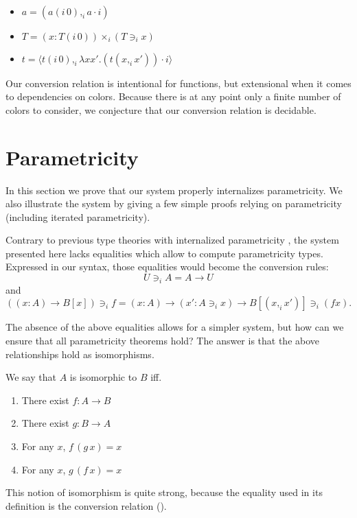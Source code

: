 \documentclass[english]{PaperTools/latex/lipics}
\newcommand\CP[3]{(#2,_{#1} #3)}
\newcommand\CTimes[2]{(#2) ×_{#1}}
\newcommand\param[1]{\!\cdot\!#1}
\newcommand\op[1]{∋_{#1}}
\newcommand\fp[3]{⟨#2 ,_{#1} #3⟩}
\newcommand\mor[2]{({#1}\,{#2})}
\newcommand\proj[2]{{#2}\mor{#1}0}
\begin{document}
\begin{corollary}~
  \label{cor:equalities}
  \begin{itemize}
  \item $a = \CP i {\proj i a} {a \param i}$
  \item $T = \CTimes i {x:\proj i T} {(T \op i x)}$
  \item $t = \fp i {\proj i t} {λx x'. (t \CP i x {x'}) \param i}$
  \end{itemize}
\end{corollary}

Our conversion relation is intentional for functions, but extensional
when it comes to dependencies on colors. Because there is at any point
only a finite number of colors to consider, we conjecture that our
conversion relation is decidable.

\section{Parametricity}
\label{sec:parametricity}
In this section we prove that our system properly internalizes
parametricity. We also illustrate the system by giving a few simple
proofs relying on parametricity (including iterated parametricity).

Contrary to previous type theories with internalized parametricity
\citep{bernardy_computational_2012, bernardy_type-theory_2013}, the
system presented here lacks equalities which allow to compute
parametricity types. Expressed in our syntax, those equalities would become the conversion rules:
$$U \op i A = A → U$$
and
$$((x:A) → B[x]) \op i f = (x:A) → (x' : A \op i x) → B[\CP i x {x'}] \op i (f x).$$

The absence of the above equalities allows for a simpler system, but
how can we ensure that all parametricity theorems hold?  The answer is
that the above relationships hold as isomorphisms.

We say that $A$ is isomorphic to $B$ iff.
\begin{enumerate}
  \item There exist $f : A → B$
  \item There exist $g : B → A$
  \item For any $x$, $f\, (g\, x) = x$
  \item For any $x$, $g\, (f\, x) = x$
\end{enumerate}
This notion of isomorphism is quite strong, because the equality used
in its definition is the conversion relation ().
\end{document}
